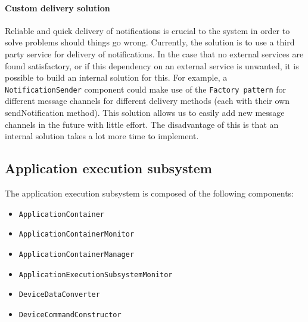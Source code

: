             \paragraph{Custom delivery solution}
                Reliable and quick delivery of notifications is crucial to the
                system in order to solve problems should things go wrong. Currently,
                the solution is to use a third party service for delivery of
                notifications. In the case that no external services are found
                satisfactory, or if this dependency on an external service is
                unwanted, it is possible to build an internal solution for this.
                For example, a \texttt{NotificationSender} component could make use
                of the \texttt{Factory pattern} for different message channels for
                different delivery methods (each with their own sendNotification method).
                This solution allows us to easily add new message channels in the
                future with little effort. The disadvantage of this is that an
                internal solution takes a lot more time to implement.

    \subsection{Application execution subsystem}
        The application execution subsystem is composed of the following components:
        \begin{itemize}
            \item \texttt{ApplicationContainer}
            \item \texttt{ApplicationContainerMonitor}
            \item \texttt{ApplicationContainerManager}
            \item \texttt{ApplicationExecutionSubsystemMonitor}
            \item \texttt{DeviceDataConverter}
            \item \texttt{DeviceCommandConstructor}
        \end{itemize}


